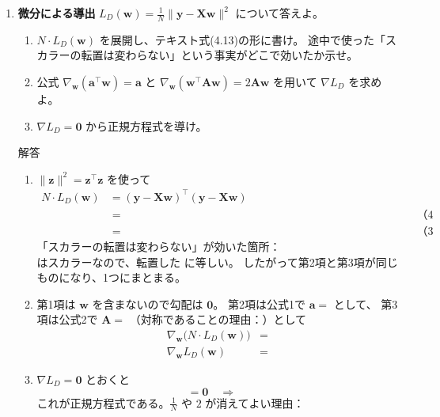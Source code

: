 \documentclass[a4paper,dvipdfmx]{jsarticle}
\newcommand{\提出期限}{2026年10月19日（月）}
\newcommand{\学籍番号}{0000000}
\newcommand{\氏名}{氏名を書く}
\newcommand{\提出日}{2026年10月19日}
\newenvironment{answer}{\begin{itembox}[l]{解答}}{\end{itembox}}
\begin{document}
\begin{enumerate}
  \item \textbf{微分による導出}\quad
    $L_D(\bm{w}) = \frac{1}{N}\|\bm{y} - \bm{X}\bm{w}\|^2$ について答えよ。
    \begin{enumerate}
      \item $N \cdot L_D(\bm{w})$ を展開し、テキスト式(4.13)の形に書け。
        途中で使った「スカラーの転置は変わらない」という事実がどこで効いたか示せ。
      \item 公式 $\nabla_{\bm{w}}(\bm{a}^\top\bm{w}) = \bm{a}$ と
        $\nabla_{\bm{w}}(\bm{w}^\top\bm{A}\bm{w}) = 2\bm{A}\bm{w}$ を用いて $\nabla L_D$ を求めよ。
      \item $\nabla L_D = \bm{0}$ から正規方程式を導け。
    \end{enumerate}
    \begin{answer}
      \begin{enumerate}
        \item $\|\bm{z}\|^2 = \bm{z}^\top\bm{z}$ を使って
          \begin{align*}
            N \cdot L_D(\bm{w})
              &= (\bm{y} - \bm{X}\bm{w})^\top (\bm{y} - \bm{X}\bm{w}) \\
              &= \phantom{XXXXXXXXXXXXXXXXXXXXXXXXXXXXXX} && \text{（4つの項に展開）} \\
              &= \phantom{XXXXXXXXXXXXXXXXXXXXXXXXXXXXXX} && \text{（3つの項にまとめる）}
          \end{align*}
          「スカラーの転置は変わらない」が効いた箇所：\\
          \phantom{XXXXXXXX} はスカラーなので、転置した \phantom{XXXXXXXX} に等しい。
          したがって第2項と第3項が同じものになり、1つにまとまる。
        \item 第1項は $\bm{w}$ を含まないので勾配は $\bm{0}$。
          第2項は公式1で $\bm{a} = $ \phantom{XXXXXX} として、
          第3項は公式2で $\bm{A} = $ \phantom{XXXXXX}（対称であることの理由：\phantom{XXXXXXXXXX}）として
          \begin{align*}
            \nabla_{\bm{w}}\bigl(N \cdot L_D(\bm{w})\bigr) &= \\
            \nabla_{\bm{w}} L_D(\bm{w}) &=
          \end{align*}
        \item $\nabla L_D = \bm{0}$ とおくと
          \begin{equation*}
            \phantom{XXXXXXXXXXXXXXXX} = \bm{0}
            \quad\Longrightarrow\quad
            \phantom{XXXXXXXXXXXXXXXX}
          \end{equation*}
          これが正規方程式である。$\frac{1}{N}$ や $2$ が消えてよい理由：
      \end{enumerate}
    \end{answer}


\end{enumerate}
\end{document}
